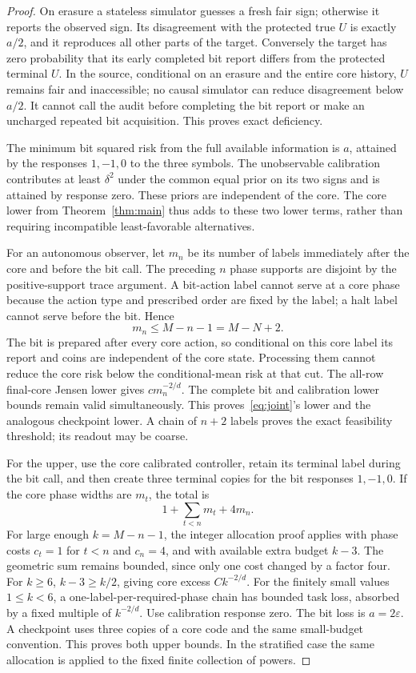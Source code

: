 \begin{proof}
On erasure a stateless simulator guesses a fresh fair sign; otherwise it reports the observed sign. Its disagreement with the protected true $U$ is exactly $a/2$, and it reproduces all other parts of the target. Conversely the target has zero probability that its early completed bit report differs from the protected terminal $U$. In the source, conditional on an erasure and the entire core history, $U$ remains fair and inaccessible; no causal simulator can reduce disagreement below $a/2$. It cannot call the audit before completing the bit report or make an uncharged repeated bit acquisition. This proves exact deficiency.

The minimum bit squared risk from the full available information is $a$, attained by the responses $1,-1,0$ to the three symbols. The unobservable calibration contributes at least $\delta^2$ under the common equal prior on its two signs and is attained by response zero. These priors are independent of the core. The core lower from Theorem~\ref{thm:main} thus adds to these two lower terms, rather than requiring incompatible least-favorable alternatives.

For an autonomous observer, let $m_n$ be its number of labels immediately after the core and before the bit call. The preceding $n$ phase supports are disjoint by the positive-support trace argument. A bit-action label cannot serve at a core phase because the action type and prescribed order are fixed by the label; a halt label cannot serve before the bit. Hence
\[
 m_n\le M-n-1=M-N+2.
\]
The bit is prepared after every core action, so conditional on this core label its report and coins are independent of the core state. Processing them cannot reduce the core risk below the conditional-mean risk at that cut. The all-row final-core Jensen lower gives $c m_n^{-2/d}$. The complete bit and calibration lower bounds remain valid simultaneously. This proves~\eqref{eq:joint}'s lower and the analogous checkpoint lower. A chain of $n+2$ labels proves the exact feasibility threshold; its readout may be coarse.

For the upper, use the core calibrated controller, retain its terminal label during the bit call, and then create three terminal copies for the bit responses $1,-1,0$. If the core phase widths are $m_t$, the total is
\[
 1+\sum_{t<n}m_t+4m_n.
\]
For large enough $k=M-n-1$, the integer allocation proof applies with phase costs $c_t=1$ for $t<n$ and $c_n=4$, and with available extra budget $k-3$. The geometric sum remains bounded, since only one cost changed by a factor four. For $k\ge6$, $k-3\ge k/2$, giving core excess $Ck^{-2/d}$. For the finitely small values $1\le k<6$, a one-label-per-required-phase chain has bounded task loss, absorbed by a fixed multiple of $k^{-2/d}$. Use calibration response zero. The bit loss is $a=2\varepsilon$. A checkpoint uses three copies of a core code and the same small-budget convention. This proves both upper bounds. In the stratified case the same allocation is applied to the fixed finite collection of powers.
\end{proof}

